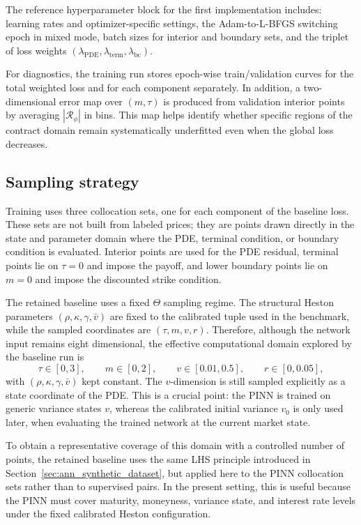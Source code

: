 The reference hyperparameter block for the first implementation includes: learning rates and optimizer-specific settings, the Adam-to-L-BFGS switching epoch in mixed mode, batch sizes for interior and boundary sets, and the triplet of loss weights $(\lambda_{\mathrm{PDE}},\lambda_{\mathrm{term}},\lambda_{\mathrm{bc}})$.

For diagnostics, the training run stores epoch-wise train/validation curves for the total weighted loss and for each component separately. In addition, a two-dimensional error map over $(m,\tau)$ is produced from validation interior points by averaging $|\mathcal{R}_\phi|$ in bins. This map helps identify whether specific regions of the contract domain remain systematically underfitted even when the global loss decreases.

\subsection{Sampling strategy}

Training uses three collocation sets, one for each component of the baseline loss. These sets are not built from labeled prices; they are points drawn directly in the state and parameter domain where the PDE, terminal condition, or boundary condition is evaluated. Interior points are used for the PDE residual, terminal points lie on \(\tau=0\) and impose the payoff, and lower boundary points lie on \(m=0\) and impose the discounted strike condition.

The retained baseline uses a fixed \(\Theta\) sampling regime. The structural Heston parameters \((\rho,\kappa,\gamma,\bar v)\) are fixed to the calibrated tuple used in the benchmark, while the sampled coordinates are \((\tau,m,v,r)\). Therefore, although the network input remains eight dimensional, the effective computational domain explored by the baseline run is
\[
\tau \in [0,3],\qquad
m \in [0,2],\qquad
v \in [0.01,0.5],\qquad
r \in [0,0.05],
\]
with \((\rho,\kappa,\gamma,\bar v)\) kept constant. The $v$-dimension is still sampled explicitly as a state coordinate of the PDE. This is a crucial point: the PINN is trained on generic variance states $v$, whereas the calibrated initial variance $v_0$ is only used later, when evaluating the trained network at the current market state.

To obtain a representative coverage of this domain with a controlled number of points, the retained baseline uses the same LHS principle introduced in Section~\ref{sec:ann_synthetic_dataset}, but applied here to the PINN collocation sets rather than to supervised pairs. In the present setting, this is useful because the PINN must cover maturity, moneyness, variance state, and interest rate levels under the fixed calibrated Heston configuration.

